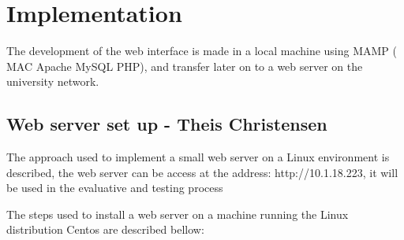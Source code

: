 \section{Implementation}
The development of the web interface is made in a local machine using MAMP ( MAC Apache MySQL PHP), and transfer later on to a web server on the university network. 

\subsection{Web server set up - Theis Christensen}
The approach used to implement a small web server on a Linux environment is described, the web server can be access at the address: http://10.1.18.223, it will be used in the evaluative and testing process

The steps used to install a web server on a machine running the Linux distribution Centos are described bellow:
